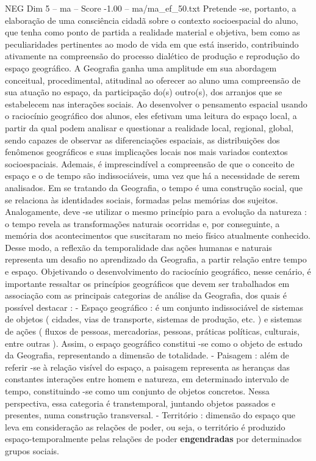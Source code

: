\begin{textsample}{NEG Dim 5 – ma – Score -1.00 – ma/ma\_ef\_50.txt}
Pretende -se, portanto, a elaboração de uma consciência cidadã sobre o contexto socioespacial do aluno, que tenha como ponto de partida a realidade material e objetiva, bem como as peculiaridades pertinentes ao modo de vida em que está inserido, contribuindo ativamente na compreensão do processo dialético de produção e reprodução do espaço geográfico.
A Geografia ganha uma amplitude em sua abordagem conceitual, procedimental, atitudinal ao oferecer ao aluno uma compreensão de sua atuação no espaço, da participação do(s) outro(s), dos arranjos que se estabelecem nas interações sociais.
Ao desenvolver o pensamento espacial usando o raciocínio geográfico dos alunos, eles efetivam uma leitura do espaço local, a partir da qual podem analisar e questionar a realidade local, regional, global, sendo capazes de observar as diferenciações espaciais, as distribuições dos fenômenos geográficos e suas implicações locais nos mais variados contextos socioespaciais.
Ademais, é imprescindível a compreensão de que o conceito de espaço e o de tempo são indissociáveis, uma vez que há a necessidade de serem analisados.
Em se tratando da Geografia, o tempo é uma construção social, que se relaciona às identidades sociais, formadas pelas memórias dos sujeitos.
Analogamente, deve -se utilizar o mesmo princípio para a evolução da natureza : o tempo revela as transformações naturais ocorridas e, por conseguinte, a memória dos acontecimentos que suscitaram no meio físico atualmente conhecido.
Desse modo, a reflexão da temporalidade das ações humanas e naturais representa um desafio no aprendizado da Geografia, a partir relação entre tempo e espaço.
Objetivando o desenvolvimento do raciocínio geográfico, nesse cenário, é importante ressaltar os princípios geográficos que devem ser trabalhados em associação com as principais categorias de análise da Geografia, dos quais é possível destacar : - Espaço geográfico : é um conjunto indissociável de sistemas de objetos ( cidades, vias de transporte, sistemas de produção, etc. ) e sistemas de ações ( fluxos de pessoas, mercadorias, pessoas, práticas políticas, culturais, entre outras ).
Assim, o espaço geográfico constitui -se como o objeto de estudo da Geografia, representando a dimensão de totalidade. - Paisagem : além de referir -se à relação visível do espaço, a paisagem representa as heranças das constantes interações entre homem e natureza, em determinado intervalo de tempo, constituindo -se como um conjunto de objetos concretos.
Nessa perspectiva, essa categoria é transtemporal, juntando objetos passados e presentes, numa construção transversal. - Território : dimensão do espaço que leva em consideração as relações de poder, ou seja, o território é produzido espaço-temporalmente pelas relações de poder \textbf{engendradas} por determinados grupos sociais.

\end{textsample}
